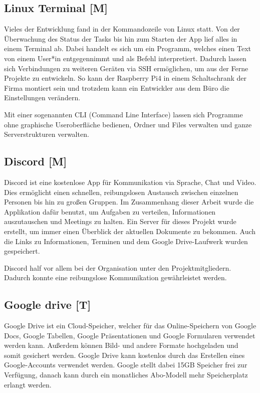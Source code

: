\subsection{Linux Terminal [M]} 
Vieles der Entwicklung fand in der Kommandozeile von Linux statt. Von der Überwachung des Status der Tasks bis hin zum Starten der App lief alles in einem Terminal ab. Dabei handelt es sich um ein Programm, welches einen Text von einem User*in entgegennimmt und als Befehl interpretiert. Dadurch lassen sich Verbindungen zu weiteren Geräten via SSH ermöglichen, um aus der Ferne Projekte zu entwickeln. So kann der Raspberry Pi4 in einem Schaltschrank der Firma montiert sein und trotzdem kann ein Entwickler aus dem Büro die Einstellungen verändern.


Mit einer sogenannten CLI (Command Line Interface) lassen sich Programme ohne graphische Useroberfläche bedienen, Ordner und Files verwalten und ganze Serverstrukturen verwalten.


\cite{CommandolineFortext}


\subsection{Discord [M]} 
Discord ist eine kostenlose App für Kommunikation via Sprache, Chat und Video. Dies ermöglicht einen schnellen, reibungslosen Austausch zwischen einzelnen Personen bis hin zu großen Gruppen. Im Zusammenhang dieser Arbeit wurde die Applikation dafür benutzt, um Aufgaben zu verteilen, Informationen auszutauschen und Meetings zu halten. Ein Server für dieses Projekt wurde erstellt, um immer einen Überblick der aktuellen Dokumente zu bekommen. Auch die Links zu Informationen, Terminen und dem Google Drive-Laufwerk wurden gespeichert.


Discord half vor allem bei der Organisation unter den Projektmitgliedern. Dadurch konnte eine reibungslose Kommunikation gewährleistet werden.


\cite{discordEpic}
\subsection{Google drive [T]} 


Google Drive ist ein Cloud-Speicher, welcher für das Online-Speichern von Google Docs, Google Tabellen, Google Präsentationen und Google Formularen verwendet werden kann. Außerdem können Bild- und andere Formate hochgeladen und somit gesichert werden. Google Drive kann kostenlos durch das Erstellen eines Google-Accounts verwendet werden. Google stellt dabei 15GB Speicher frei zur Verfügung, danach kann durch ein monatliches Abo-Modell mehr Speicherplatz erlangt werden. \cite{OneDriveOfficialSite}


